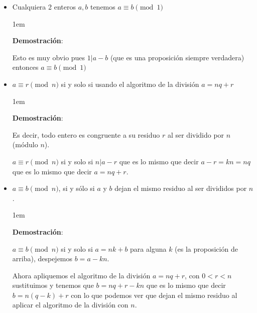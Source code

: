\documentclass[12pt, fleqn]{report}                             %
\newenvironment{SmallIndentation}[1][0.75em]                    %
    {\begin{adjustwidth}{#1}{}\begin{footnotesize}}                 %
    {\end{footnotesize}\end{adjustwidth}}                           %
\begin{document}
            \begin{itemize}

                \item Cualquiera 2 enteros $a,b$ tenemos $a \equiv b \pmod{1}$

                    \begin{SmallIndentation}[1em]
                        \textbf{Demostración}:

                        Esto es muy obvio pues $1|a-b$ (que es una proposición siempre
                        verdadera) entonces $a \equiv b \pmod{1}$

                    \end{SmallIndentation}

                \item $a \equiv r \pmod{n}$ si y solo si usando el algoritmo de la división $a=nq+r$

                    \begin{SmallIndentation}[1em]
                        \textbf{Demostración}:

                        Es decir, todo entero es congruente a su residuo $r$ al ser dividido por $n$
                        (módulo $n$).

                        $a \equiv r \pmod{n}$ si y solo si $n|a-r$ que es lo mismo
                        que decir $a-r = kn = nq$ que es lo mismo que decir $a=nq+r$.

                    \end{SmallIndentation}

                \item $a \equiv b \pmod{n}$, si y sólo si $a$ y $b$ dejan el mismo
                    residuo al ser divididos por $n$.

                    \begin{SmallIndentation}[1em]
                        \textbf{Demostración}:

                        $a \equiv b \pmod{n}$ si y solo si $a=nk+b$ para alguna $k$ (es
                        la proposición de arriba), despejemos $b=a-kn$.

                        Ahora apliquemos el algoritmo de la división $a=nq+r$, con $0<r<n$
                        sustituimos y tenemos que $b=nq+r -kn$ que es lo mismo que decir
                        $b=n(q-k)+r$ con lo que podemos ver que dejan el mismo residuo al 
                        aplicar el algoritmo de la división con $n$.


\end{SmallIndentation}
\end{itemize}
\end{document}
